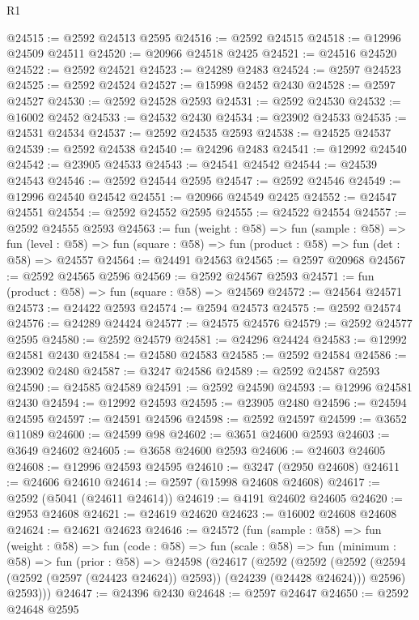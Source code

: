 \begin{lexlean}{R1}
\begin{coremodule}
@24515 := @2592 @24513 @2595
@24516 := @2592 @24515
@24518 := @12996 @24509 @24511
@24520 := @20966 @24518 @2425
@24521 := @24516 @24520
@24522 := @2592 @24521
@24523 := @24289 @2483
@24524 := @2597 @24523
@24525 := @2592 @24524
@24527 := @15998 @2452 @2430
@24528 := @2597 @24527
@24530 := @2592 @24528 @2593
@24531 := @2592 @24530
@24532 := @16002 @2452
@24533 := @24532 @2430
@24534 := @23902 @24533
@24535 := @24531 @24534
@24537 := @2592 @24535 @2593
@24538 := @24525 @24537
@24539 := @2592 @24538
@24540 := @24296 @2483
@24541 := @12992 @24540
@24542 := @23905 @24533
@24543 := @24541 @24542
@24544 := @24539 @24543
@24546 := @2592 @24544 @2595
@24547 := @2592 @24546
@24549 := @12996 @24540 @24542
@24551 := @20966 @24549 @2425
@24552 := @24547 @24551
@24554 := @2592 @24552 @2595
@24555 := @24522 @24554
@24557 := @2592 @24555 @2593
@24563 := fun (weight : @58) =>
  fun (sample : @58) =>
  fun (level : @58) => fun (square : @58) => fun (product : @58) => fun (det : @58) => @24557
@24564 := @24491 @24563
@24565 := @2597 @20968
@24567 := @2592 @24565 @2596
@24569 := @2592 @24567 @2593
@24571 := fun (product : @58) => fun (square : @58) => @24569
@24572 := @24564 @24571
@24573 := @24422 @2593
@24574 := @2594 @24573
@24575 := @2592 @24574
@24576 := @24289 @24424
@24577 := @24575 @24576
@24579 := @2592 @24577 @2595
@24580 := @2592 @24579
@24581 := @24296 @24424
@24583 := @12992 @24581 @2430
@24584 := @24580 @24583
@24585 := @2592 @24584
@24586 := @23902 @2480
@24587 := @3247 @24586
@24589 := @2592 @24587 @2593
@24590 := @24585 @24589
@24591 := @2592 @24590
@24593 := @12996 @24581 @2430
@24594 := @12992 @24593
@24595 := @23905 @2480
@24596 := @24594 @24595
@24597 := @24591 @24596
@24598 := @2592 @24597
@24599 := @3652 @11089
@24600 := @24599 @98
@24602 := @3651 @24600 @2593
@24603 := @3649 @24602
@24605 := @3658 @24600 @2593
@24606 := @24603 @24605
@24608 := @12996 @24593 @24595
@24610 := @3247 (@2950 @24608)
@24611 := @24606 @24610
@24614 := @2597 (@15998 @24608 @24608)
@24617 := @2592 (@5041 (@24611 @24614))
@24619 := @4191 @24602 @24605
@24620 := @2953 @24608
@24621 := @24619 @24620
@24623 := @16002 @24608 @24608
@24624 := @24621 @24623
@24646 := @24572
    (fun (sample : @58) =>
    fun (weight : @58) =>
    fun (code : @58) =>
    fun (scale : @58) =>
    fun (minimum : @58) =>
    fun (prior : @58) =>
    @24598
      (@24617
        (@2592
          (@2592
            (@2592 (@2594 (@2592 (@2597 (@24423 @24624)) @2593)) (@24239 (@24428 @24624)))
            @2596)
          @2593)))
@24647 := @24396 @2430
@24648 := @2597 @24647
@24650 := @2592 @24648 @2595

\end{coremodule}
\end{lexlean}
